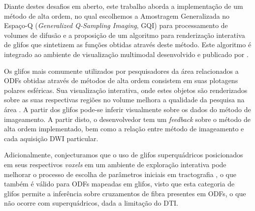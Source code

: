 \documentclass[
    12pt,                %
    oneside,            %
    a4paper,            %
    english,            %
    french,                %
    spanish,            %
    brazil                %
    ]{abntex2}
\begin{document}


Diante destes desafios em aberto, este trabalho aborda a implementação de um método de alta ordem, no qual escolhemos a Amostragem Generalizada no Espaço-Q (\textit{Generalized Q-Sampling Imaging}, GQI) para processamento de volumes de difusão e a proposição de um algoritmo para renderização interativa de glifos que sintetizem as funções obtidas através deste método. Este algoritmo é integrado ao ambiente de visualização multimodal desenvolvido e publicado por .

Os glifos mais comumente utilizados por pesquisadores da área relacionados a ODFs obtidas através de métodos de alta ordem consistem em suas plotagens polares esféricas. Sua visualização interativa, onde estes objetos são renderizados sobre as suas respectivas regiões no volume melhora a qualidade da pesquisa na área \cite{peeters2009}. A partir dos glifos pode-se inferir visualmente sobre os dados do método de imageamento. A partir disto, o desenvolvedor tem um \textit{feedback} sobre o método de alta ordem implementado, bem como a relação entre método de imageamento e cada aquisição DWI particular.

Adicionalmente, conjecturamos que o uso de glifos superquádricos posicionados em seus respectivos \textit{voxels} em um ambiente de exploração interativa pode melhorar o processo de escolha de parâmetros iniciais em tractografia \cite{voltoline2021}, o que também é válido para ODFs mapeadas em glifos, visto que esta categoria de glifos permite a inferência sobre cruzamentos de fibra presentes em ODFs, o que não ocorre com superquádricos, dada a limitação do DTI.



\end{document}
